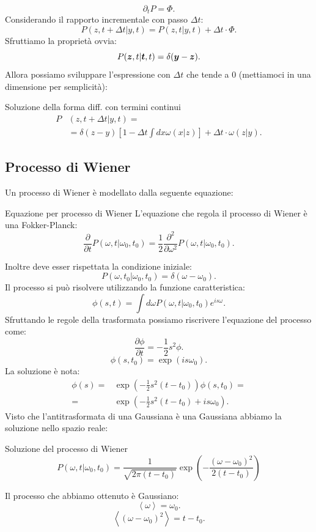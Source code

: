 \begin{exmp}[$A=B=0$, quindi $\Gamma =0$]
    \[
        \partial_{t}P = \Phi
    .\] 
    Considerando il rapporto incrementale con passo $\Delta t$:
    \[
	P(z, t+\Delta t|y, t) = P(z,t|y,t) + \Delta t\cdot  \Phi
    .\] 
    Sfruttiamo la proprietà ovvia:
    \[
	P(\boldsymbol{z}, t|\boldsymbol{t}, t) = \delta (\boldsymbol{y}-\boldsymbol{z}) 
    .\] 
    Allora possiamo sviluppare l'espressione con $\Delta t$ che tende a $0$ (mettiamoci in una dimensione per semplicità):
    \begin{greenbox}{Soluzione della forma diff. con termini continui}
    \[\begin{aligned}
	P&(z, t + \Delta t| y, t) = \\
				  &= \delta (z-y) \left[1-\Delta t\int dx \omega (x|z) \right] + \Delta t \cdot \omega (z|y) 
    .\end{aligned}\]
    \end{greenbox}
    \noindent
\end{exmp}
\noindent

\subsection{Processo di Wiener}%
\label{sub:Processo di Wiener}
Un processo di Wiener è modellato dalla seguente equazione:
\begin{greenbox}{Equazione per processo di Wiener}
    L'equazione che regola il processo di Wiener è una Fokker-Planck:
    \[
	\frac{\partial }{\partial t} P(\omega,t|\omega_0, t_0) =
	\frac{1}{2}\frac{\partial ^2}{\partial \omega^2} P(\omega, t|\omega_0, t_0) 
    .\] 
\end{greenbox}
\noindent
Inoltre deve esser rispettata la condizione iniziale:
\[
    P(\omega,t_0|\omega_0, t_0) = \delta (\omega-\omega_0) 
.\]
Il processo si può risolvere utilizzando la funzione caratteristica:
\[
    \phi (s, t) = \int d\omega P(\omega, t|\omega_0, t_0) e^{is\omega}
.\] 
Sfruttando le regole della trasformata possiamo riscrivere l'equazione del processo come:
\[
    \frac{\partial \phi }{\partial t} = -\frac{1}{2}s^2\phi
.\] 
\[
    \phi (s, t_0) = \exp (is\omega_0) 
.\] 
La soluzione è nota:
\[\begin{aligned}
    \phi (s) =& \exp\left(-\frac{1}{2}s^2\left(t-t_0\right)\right)\phi (s,t_0)  =\\
    	=&\exp\left(-\frac{1}{2}s^2\left(t-t_0\right) + is\omega_0 \right) 
.\end{aligned}\]
Visto che l'antitrasformata di una Gaussiana è una Gaussiana abbiamo la soluzione nello spazio reale:
\begin{redbox}{Soluzione del processo di Wiener}
    \[
	P(\omega,t|\omega_0, t_0) = 
	\frac{1}{\sqrt{2\pi\left(t-t_0\right)} }
	\exp\left(- \frac{\left(\omega-\omega_0\right)^2}{2\left(t-t_0\right)}\right)
    \] 
\end{redbox}
\noindent
Il processo che abbiamo ottenuto è Gaussiano:
\[
    \left<\omega\right> =  \omega_0
.\] 
\[
    \left<\left(\omega-\omega_0\right)^2\right> = t- t_0
.\] 
